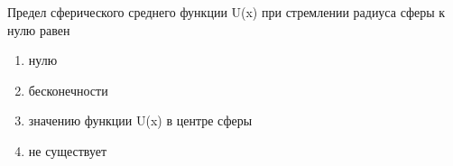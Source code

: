 Предел сферического среднего функции U(x) при стремлении радиуса сферы к нулю равен

\begin{enumerate}[label=\arabic*)]
    \item нулю
    \item бесконечности
    \item значению функции U(x) в центре сферы
    \item не существует
\end{enumerate}


